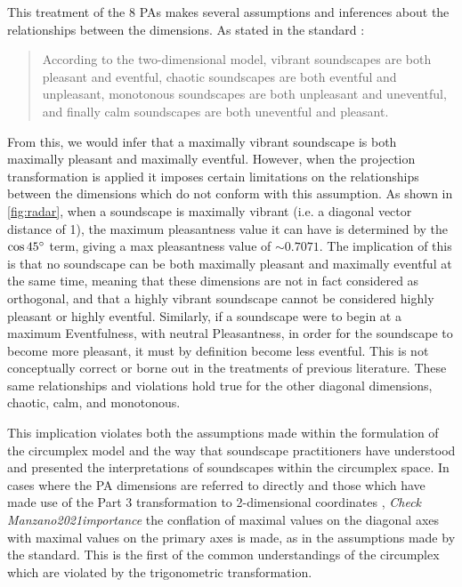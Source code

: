 This treatment of the 8 PAs makes several assumptions and inferences about the relationships between the dimensions. As stated in the standard \citep[p. 5]{ISO12913Part3}:

\begin{quote}
  According to the two-dimensional model, vibrant soundscapes are both pleasant and eventful, chaotic soundscapes are both eventful and unpleasant, monotonous soundscapes are both unpleasant and uneventful, and finally calm soundscapes are both uneventful and pleasant.
\end{quote}

From this, we would infer that a maximally vibrant soundscape is both maximally pleasant and maximally eventful. However, when the projection transformation is applied it imposes certain limitations on the relationships between the dimensions which do not conform with this assumption. As shown in \cref{fig:radar}, when a soundscape is maximally vibrant (i.e. a diagonal vector distance of 1), the maximum pleasantness value it can have is determined by the $\cos 45\degree$ term, giving a max pleasantness value of $\sim0.7071$. The implication of this is that no soundscape can be both maximally pleasant and maximally eventful at the same time, meaning that these dimensions are not in fact considered as orthogonal, and that a highly vibrant soundscape cannot be considered highly pleasant or highly eventful. Similarly, if a soundscape were to begin at a maximum Eventfulness, with neutral Pleasantness, in order for the soundscape to become more pleasant, it must by definition become less eventful. This is not conceptually correct or borne out in the treatments of previous literature. These same relationships and violations hold true for the other diagonal dimensions, chaotic, calm, and monotonous.

This implication violates both the assumptions made within the formulation of the circumplex model and the way that soundscape practitioners have understood and presented the interpretations of soundscapes within the circumplex space. In cases where the PA dimensions are referred to directly \citep{steele2016evaluation, steele2019soundtracking} and those which have made use of the Part 3 transformation to 2-dimensional coordinates \citep{Mancini2021Soundwalk, Lionello2021Introducing, Manzano2021importance}, \emph{Check Manzano2021importance} the conflation of maximal values on the diagonal axes with maximal values on the primary axes is made, as in the assumptions made by the standard. This is the first of the common understandings of the circumplex which are violated by the trigonometric transformation.

